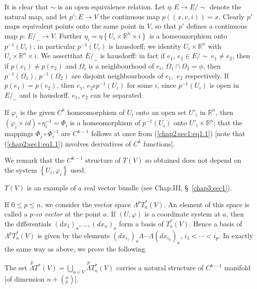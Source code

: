 It is clear that $\sim$ is an open equivalence relation. Let $\eta :E
\to E/\sim$ denote the natural map, and let $p': E \to V$ the
continuous map $p((x,v,i)) =x$. Clearly $p'$ maps equivalent points
onto the same point in $V$, so that $p'$ defines a continuous map
$p$: $E/_\sim \to V$. Further $\eta_i = \eta \left\{ U_i \times
\mathbb{R}^n \times i \right\}$ is a homeomorphism onto $p^{-1}(U_i)$;
in particular $p^{-1}(U_i)$ is hausdorff; we identity $U_i \times
\mathbb{R}^n$ with $U_i \times \mathbb{R}^n \times i$. We assert\pageoriginale that
$E / _\sim$ is hausdorff: in fact if $e_1$, $e_2 \in E/\sim ~e_1 \neq
e_2$, then if $p(e_1)\neq p(e_2)$ and $\Omega_i$ is a neighbourhood of
$e_i$, $\Omega_1 \cap \Omega_2 = \phi$, then $p^{-1}(\Omega_1)$,
$p^{-1}(\Omega_2)$ are disjoint neighbourhoods of $e_1,$ $e_2$
respectively. If $p(e_1) = p(e_2)$, then $e_1$, $e_2 \epsilon p^{-1}(U_i)$
for some $i$, since $p^{-1}(U_i)$ is open in $E /_\sim$ and is
hausdorff, $e_1$, $e_2$ can be separated. 

If $\varphi_i$ is the given $C^k$ homeomorphism of $U_i$ onto an open
set $U'_i$ in $\mathbb{R}^n$, then $( \varphi_i \times id) \circ
\eta_i^{-1} = \Phi_i$ is a homeomorphism of $p^{-1}(U_i)$ onto $U'_i
\times \mathbb{R}^n$; that the mappings  $\Phi_j \circ \Phi_i^{-1}$ are
$C^{k-1}$ follows at once from (\ref{chap2:sec1:eq1.1}) [note that
  (\ref{chap2:sec1:eq1.1}) involves
  derivatives of $C^{k}$ functions]. 

We remark that the $C^{k-1}$ structure of $T(V)$ so obtained does not
depend on the system $\left\{ U_i , \varphi_i \right\}$ used. 

$T(V)$ is an example of a real vector bundle (see Chap.III,
\S\ \ref{chap3:sec1}). 

If $0 \leq p \leq n$, we consider the vector space $\Lambda^{p}
T^*_a(V)$. An element of this space is called  a \textit{$p$-co vector}
at the point $a$. If $(U, \varphi)$ is a coordinate system at $a$,
then the differentials $(dx_1)_a, \ldots , (dx_n)_a$ form  a basis of
$T^*_a(V)$. Hence a basis of $\Lambda^{p} T^*_a(V)$ is given by the
elements $(dx_{i_1})_a \Lambda \cdots \Lambda(dx_{i_p})_a$, $i_1 <
\cdots < i_p$. In exactly the same way as above, we prove the
following  

\begin{theorem}\label{chap2:sec1:thm2} %
  The set $\overset{p}\Lambda T^*(V) = \bigcup\limits_{a \in V}
  \overset{p}\Lambda T^*_a(V)$ carries a natural structure of
  $C^{k-1}$ manifold [of dimension $n + (^n_p) $].  
\end{theorem}


